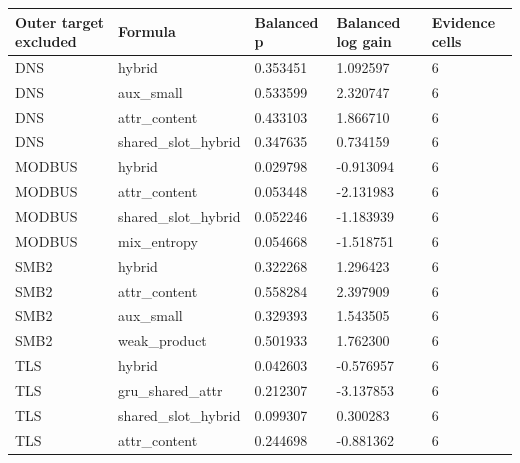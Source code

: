 \begin{tabular}{lllll}
\hline
Outer target excluded & Formula & Balanced p & Balanced log gain & Evidence cells \\
\hline
DNS & hybrid & 0.353451 & 1.092597 & 6 \\
DNS & aux\_small & 0.533599 & 2.320747 & 6 \\
DNS & attr\_content & 0.433103 & 1.866710 & 6 \\
DNS & shared\_slot\_hybrid & 0.347635 & 0.734159 & 6 \\
MODBUS & hybrid & 0.029798 & -0.913094 & 6 \\
MODBUS & attr\_content & 0.053448 & -2.131983 & 6 \\
MODBUS & shared\_slot\_hybrid & 0.052246 & -1.183939 & 6 \\
MODBUS & mix\_entropy & 0.054668 & -1.518751 & 6 \\
SMB2 & hybrid & 0.322268 & 1.296423 & 6 \\
SMB2 & attr\_content & 0.558284 & 2.397909 & 6 \\
SMB2 & aux\_small & 0.329393 & 1.543505 & 6 \\
SMB2 & weak\_product & 0.501933 & 1.762300 & 6 \\
TLS & hybrid & 0.042603 & -0.576957 & 6 \\
TLS & gru\_shared\_attr & 0.212307 & -3.137853 & 6 \\
TLS & shared\_slot\_hybrid & 0.099307 & 0.300283 & 6 \\
TLS & attr\_content & 0.244698 & -0.881362 & 6 \\
\hline
\end{tabular}
